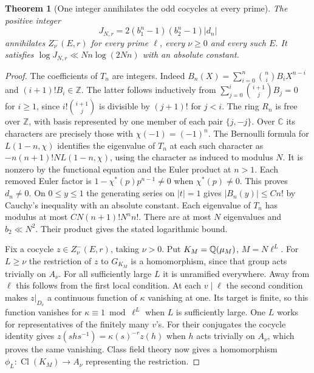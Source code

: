 \documentclass[a4paper,11pt]{article}
\newtheorem{theorem}[proposition]{Theorem}
\theoremstyle{definition}
\theoremstyle{remark}
\newcommand{\ZZ}{\mathbb Z}\newcommand{\ord}{\operatorname{ord}}
\numberwithin{equation}{section}
\newcommand{\Cl}{\operatorname{Cl}}
\begin{document}
\begin{theorem}[One integer annihilates the odd cocycles at every prime]
\leavevmode\label{thm:uniformannihilator676}
The positive integer
\[
           J_{N,r}=2(b_1^n-1)(b_2^n-1)|d_n|
\]
annihilates \(Z^-_\nu(E,r)\) for every prime \(\ell\), every
\(\nu\ge0\) and every such \(E\). It satisfies
\(\log J_{N,r}\ll N n\log(2Nn)\) with an absolute constant.
\end{theorem}
\begin{proof}
The coefficients of \(T_n\) are integers. Indeed
\(B_n(X)=\sum_{i=0}^n\binom ni B_i X^{n-i}\) and
\((i+1)!B_i\in\ZZ\). The latter follows inductively from
\(\sum_{j=0}^{i}\binom{i+1}{j}B_j=0\) for \(i\ge1\), since
\(i!\binom{i+1}{j}\) is divisible by \((j+1)!\) for \(j<i\).
The ring \(R_n\) is free over \(\ZZ\), with basis represented
by one member of each pair \(\{j,-j\}\). Over \(\mathbb C\)
its characters are precisely those with \(\chi(-1)=(-1)^n\).
The Bernoulli formula for \(L(1-n,\chi)\) identifies the
eigenvalue of \(T_n\) at each such character as
\(-n(n+1)!N L(1-n,\chi)\), using the character as induced to
modulus \(N\). It is nonzero by the functional equation and
the Euler product at \(n>1\). Each removed Euler factor is
\(1-\chi^*(p)p^{n-1}\ne0\) when \(\chi^*(p)\ne0\).
This proves \(d_n\ne0\). On \(0\le y\le1\) the generating
series on \(|t|=1\) gives \(|B_n(y)|\le Cn!\) by Cauchy's
inequality with an absolute constant. Each eigenvalue of
\(T_n\) has modulus at most \(CN(n+1)!N^n n!\).
There are at most \(N\) eigenvalues and \(b_2\ll N^2\).
Their product gives the stated logarithmic bound.

Fix a cocycle \(z\in Z^-_\nu(E,r)\), taking \(\nu>0\). Put
\(K_M=\mathbb Q(\mu_M)\), \(M=N\ell^L\). For \(L\ge\nu\) the
restriction of \(z\) to \(G_{K_M}\) is a homomorphism, since
that group acts trivially on \(A_\nu\). For all sufficiently
large \(L\) it is unramified everywhere. Away from \(\ell\)
this follows from the first local condition. At each \(v\mid\ell\)
the second condition makes \(z|_{D_v}\) a continuous function
of \(\kappa\) vanishing at one. Its target is finite, so this
function vanishes for \(\kappa\equiv1\bmod\ell^L\) when \(L\)
is sufficiently large. One \(L\) works for representatives of
the finitely many \(v\)'s. For their conjugates the cocycle
identity gives \(z(shs^{-1})=\kappa(s)^{-r}z(h)\) when \(h\)
acts trivially on \(A_\nu\), which proves the same vanishing.
Class field theory now gives a homomorphism
\(\phi_L:\Cl(K_M)\to A_\nu\) representing the restriction.


\end{proof}
\end{document}
